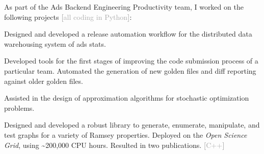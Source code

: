 \documentclass{article}
\begin{document}
\vspace*{0.25em}

As part of the \textsf{Ads Backend Engineering Productivity} team, I worked on the following
projects \textcolor{darkgray}{\textbf{[}all coding in \textsf{Python}\textbf{]}}:
\begin{reslist}
  \item Designed and developed a release automation workflow for the distributed data
    warehousing system of ads stats.
  \item Developed tools for the first stages of improving the code submission process
    of a particular team. Automated the generation of new golden files and diff reporting against
    older golden files.
\end{reslist}

\vspace*{0.25em}

Assisted in the design of approximation algorithms
for stochastic optimization problems.


\vspace*{0.25em}

Designed and developed a robust library to generate, enumerate,
manipulate, and test graphs for a variety of Ramsey properties.
Deployed on the \emph{Open Science Grid}, using \textasciitilde 200,000 CPU hours.
Resulted in two publications. \textcolor{darkgray}{\textbf{[}\textsf{C++}\textbf{]}}

\vspace*{0.25em}


\vspace*{0.25em}
\end{document}
